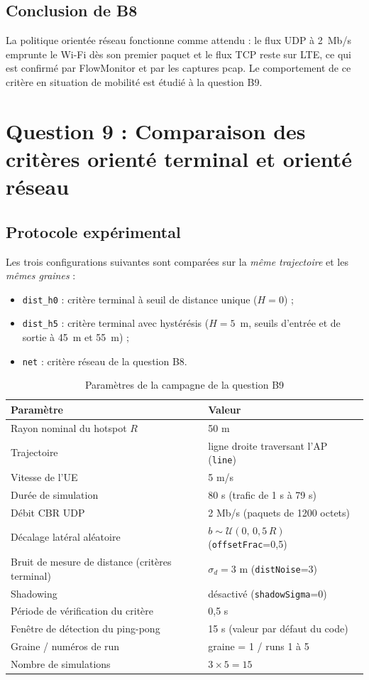\subsection{Conclusion de B8}
La politique orientée réseau fonctionne comme attendu : le flux UDP à 2~Mb/s
emprunte le Wi-Fi dès son premier paquet et le flux TCP reste sur LTE, ce qui
est confirmé par FlowMonitor et par les captures pcap. Le comportement de ce
critère en situation de mobilité est étudié à la question B9.

\section{Question 9 : Comparaison des critères orienté terminal et orienté réseau}

\subsection{Protocole expérimental}
Les trois configurations suivantes sont comparées sur la \emph{même
trajectoire} et les \emph{mêmes graines} :
\begin{itemize}
  \item \texttt{dist\_h0} : critère terminal à seuil de distance unique ($H=0$) ;
  \item \texttt{dist\_h5} : critère terminal avec hystérésis ($H=5$~m, seuils
        d'entrée et de sortie à 45~m et 55~m) ;
  \item \texttt{net} : critère réseau de la question B8.
\end{itemize}

\begin{table}[H]
\centering
\caption{Paramètres de la campagne de la question B9}
\begin{tabular}{ll}
\toprule
Paramètre & Valeur \\
\midrule
Rayon nominal du hotspot $R$ & 50 m \\
Trajectoire & ligne droite traversant l'AP (\texttt{line}) \\
Vitesse de l'UE & 5 m/s \\
Durée de simulation & 80 s (trafic de 1 s à 79 s) \\
Débit CBR UDP & 2 Mb/s (paquets de 1200 octets) \\
Décalage latéral aléatoire & $b \sim \mathcal{U}(0,\,0{,}5\,R)$ (\texttt{offsetFrac}=0,5) \\
Bruit de mesure de distance (critères terminal) & $\sigma_d = 3$ m (\texttt{distNoise}=3) \\
Shadowing & désactivé (\texttt{shadowSigma}=0) \\
Période de vérification du critère & 0,5 s \\
Fenêtre de détection du ping-pong & 15 s (valeur par défaut du code) \\
Graine / numéros de run & graine = 1 / runs 1 à 5 \\
Nombre de simulations & $3 \times 5 = 15$ \\
\bottomrule
\end{tabular}
\end{table}


